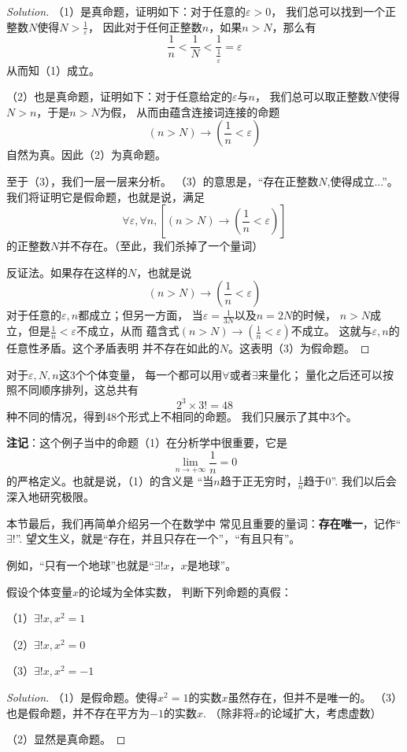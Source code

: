 \begin{proof}[Solution]
（1）是真命题，证明如下：对于任意的$\varepsilon>0$，
我们总可以找到一个正整数$N$使得$N>\frac{1}{\varepsilon}$，
因此对于任何正整数$n$，如果$n>N$，那么有
$$\frac{1}{n}<\frac{1}{N}<
\frac{1}{\frac{1}{\varepsilon}}=\varepsilon$$
从而知（1）成立。\vs

（2）也是真命题，证明如下：对于任意给定的$\varepsilon$与$n$，
我们总可以取正整数$N$使得$N>n$，于是$n>N$为假，
从而由蕴含连接词连接的命题
$$(n>N)\rightarrow(\frac{1}{n}<\varepsilon)$$
自然为真。因此（2）为真命题。\vs

至于（3），我们一层一层来分析。
（3）的意思是，“存在正整数$N$,使得成立...”。
我们将证明它是假命题，也就是说，满足
$$\forall\varepsilon,\forall n,[(n>N)
\rightarrow(\frac{1}{n}<\varepsilon)]$$
的正整数$N$并不存在。（至此，我们杀掉了一个量词）

反证法。如果存在这样的$N$，也就是说
$$(n>N)\rightarrow(\frac{1}{n}<\varepsilon)$$
对于任意的$\varepsilon,n$都成立；但另一方面，
当$\varepsilon=\frac{1}{3N}$以及$n=2N$的时候，
$n>N$成立，但是$\frac{1}{n}<\varepsilon$不成立，从而
蕴含式$(n>N)\rightarrow(\frac{1}{n}<\varepsilon)$不成立。
这就与$\varepsilon,n$的任意性矛盾。这个矛盾表明
并不存在如此的$N$。这表明（3）为假命题。
\end{proof}\vs

对于$\varepsilon,N,n$这3个个体变量，
每一个都可以用$\forall$或者$\exists$来量化；
量化之后还可以按照不同顺序排列，这总共有
$$2^3\times3!=48$$
种不同的情况，得到48个形式上不相同的命题。
我们只展示了其中3个。\vs

\textbf{注记}：这个例子当中的命题（1）在分析学中很重要，它是
$$\lim_{n\rightarrow+\infty}\frac{1}{n}=0$$
的严格定义。也就是说，（1）的含义是
“当$n$趋于正无穷时，$\frac{1}{n}$趋于0”.
我们以后会深入地研究极限。\vs

本节最后，我们再简单介绍另一个在数学中
常见且重要的量词：\textbf{存在唯一}，记作“$\exists!$”.
望文生义，就是“存在，并且只存在一个”，“有且只有”。

例如，“只有一个地球”也就是“$\exists!x$，$x$是地球”。

\begin{example}假设个体变量$x$的论域为全体实数，
判断下列命题的真假：

（1）$\exists!x,x^2=1$

（2）$\exists!x,x^2=0$

（3）$\exists!x,x^2=-1$
\end{example}

\begin{proof}[Solution]
（1）是假命题。使得$x^2=1$的实数$x$虽然存在，但并不是唯一的。
（3）也是假命题，并不存在平方为$-1$的实数$x$.
（除非将$x$的论域扩大，考虑虚数）

（2）显然是真命题。
\end{proof}

